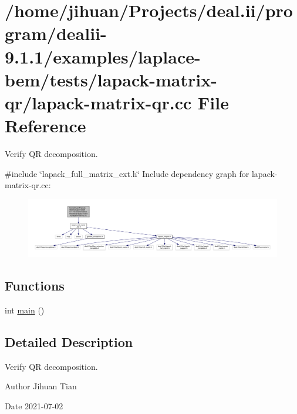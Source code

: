 \hypertarget{lapack-matrix-qr_8cc}{}\section{/home/jihuan/\+Projects/deal.ii/program/dealii-\/9.1.1/examples/laplace-\/bem/tests/lapack-\/matrix-\/qr/lapack-\/matrix-\/qr.cc File Reference}
\label{lapack-matrix-qr_8cc}


Verify QR decomposition.  


{\ttfamily \#include \char`\"{}lapack\+\_\+full\+\_\+matrix\+\_\+ext.\+h\char`\"{}}\newline
Include dependency graph for lapack-\/matrix-\/qr.cc\+:\nopagebreak
\begin{figure}[H]
\begin{center}
\leavevmode
\includegraphics[width=350pt]{lapack-matrix-qr_8cc__incl}
\end{center}
\end{figure}
\subsection*{Functions}
\begin{DoxyCompactItemize}
\item 
int \hyperlink{lapack-matrix-qr_8cc_ae66f6b31b5ad750f1fe042a706a4e3d4}{main} ()
\end{DoxyCompactItemize}


\subsection{Detailed Description}
Verify QR decomposition. 

\begin{DoxyAuthor}{Author}
Jihuan Tian 
\end{DoxyAuthor}
\begin{DoxyDate}{Date}
2021-\/07-\/02 
\end{DoxyDate}


